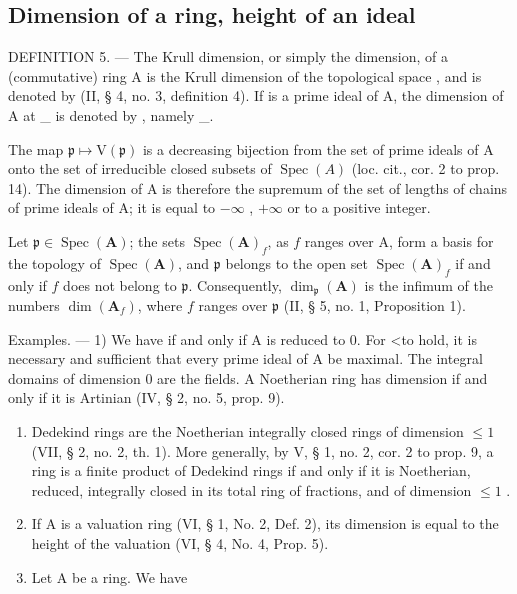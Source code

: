 \subsection{Dimension of a ring, height of an ideal}

DEFINITION 5. — The Krull dimension, or simply the dimension, of a (commutative) ring A is the Krull dimension of the topological space , and is denoted by  (II, § 4, no. 3, definition 4). If  is a prime ideal of A, the dimension of A at \_ is denoted by , namely \_.

The map \(\mathfrak{p} \mapsto \mathrm{V}(\mathfrak{p})\) is a decreasing bijection from the set of prime ideals of A onto the set of irreducible closed subsets of \(\operatorname{Spec}(A)\) (loc. cit., cor. 2 to prop. 14). The dimension of A is therefore the supremum of the set of lengths of chains of prime ideals of A; it is equal to \(-\infty\) , \(+\infty\) or to a positive integer.

Let \(\mathfrak{p} \in \operatorname{Spec}(\mathbf{A})\); the sets \(\operatorname{Spec}(\mathbf{A})_f\), as \(f\) ranges over A, form a basis for the topology of \(\operatorname{Spec}(\mathbf{A})\), and \(\mathfrak{p}\) belongs to the open set \(\operatorname{Spec}(\mathbf{A})_f\) if and only if \(f\) does not belong to \(\mathfrak{p}\). Consequently, \(\dim_{\mathfrak{p}}(\mathbf{A})\) is the infimum of the numbers \(\dim(\mathbf{A}_f)\), where \(f\) ranges over \(\mathfrak{p}\) (II, § 5, no. 1, Proposition 1).

Examples. --- 1) We have  if and only if A is reduced to 0. For \textless to hold, it is necessary and sufficient that every prime ideal of A be maximal. The integral domains of dimension 0 are the fields. A Noetherian ring has dimension {} if and only if it is Artinian (IV, § 2, no. 5, prop. 9).

\begin{enumerate}
\def\labelenumi{\arabic{enumi})}
\setcounter{enumi}{1}
\item
  Dedekind rings are the Noetherian integrally closed rings of dimension \(\leqslant 1\) (VII, § 2, no. 2, th. 1). More generally, by V, § 1, no. 2, cor. 2 to prop. 9, a ring is a finite product of Dedekind rings if and only if it is Noetherian, reduced, integrally closed in its total ring of fractions, and of dimension \(\leqslant 1\) .
\item
  If A is a valuation ring (VI, § 1, No. 2, Def. 2), its dimension is equal to the height of the valuation (VI, § 4, No. 4, Prop. 5).
\item
  Let A be a ring. We have
\end{enumerate}

